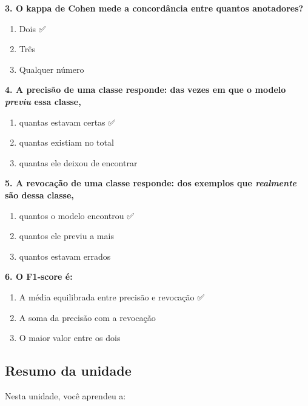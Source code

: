 \documentclass[
  brazilian,
  11pt,
]{article}
\providecommand{\tightlist}{%
  \setlength{\itemsep}{0pt}\setlength{\parskip}{0pt}}
\begin{document}
\textbf{3. O kappa de Cohen mede a concordância entre quantos
anotadores?}

\begin{enumerate}
\def\labelenumi{\arabic{enumi}.}
\tightlist
\item
  Dois ✅
\item
  Três
\item
  Qualquer número
\end{enumerate}

\textbf{4. A precisão de uma classe responde: das vezes em que o modelo
\emph{previu} essa classe,}

\begin{enumerate}
\def\labelenumi{\arabic{enumi}.}
\tightlist
\item
  quantas estavam certas ✅
\item
  quantas existiam no total
\item
  quantas ele deixou de encontrar
\end{enumerate}

\textbf{5. A revocação de uma classe responde: dos exemplos que
\emph{realmente} são dessa classe,}

\begin{enumerate}
\def\labelenumi{\arabic{enumi}.}
\tightlist
\item
  quantos o modelo encontrou ✅
\item
  quantos ele previu a mais
\item
  quantos estavam errados
\end{enumerate}

\textbf{6. O F1‑score é:}

\begin{enumerate}
\def\labelenumi{\arabic{enumi}.}
\tightlist
\item
  A média equilibrada entre precisão e revocação ✅
\item
  A soma da precisão com a revocação
\item
  O maior valor entre os dois
\end{enumerate}

\subsection{Resumo da unidade}\label{resumo-da-unidade}

Nesta unidade, você aprendeu a:
\end{document}

